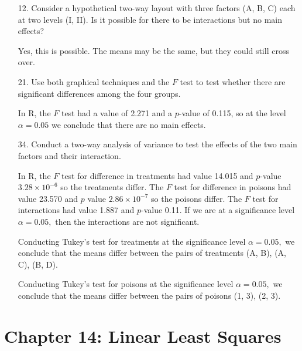 \documentclass{article}
\begin{document}
\begin{itemize}
	\item[12.] Consider a hypothetical two-way layout with three factors (A, B, C) each at two levels (I, II). Is it possible for there to be interactions but no main effects?
		\begin{answer*}
			Yes, this is possible. The means may be the same, but they could still cross over.
		\end{answer*}

	\item[21.] Use both graphical techniques and the $F$ test to test whether there are significant differences among the four groups. 
		\begin{soln}
			In R, the $F$ test had a value of 2.271 and a $p$-value of 0.115, so at the level $\alpha=0.05$ we conclude that there are no main effects.
		\end{soln}

	\item[34.] Conduct a two-way analysis of variance to test the effects of the two main factors and their interaction.
		\begin{soln}
			In R, the $F$ test for difference in treatments had value 14.015 and $p$-value $3.28\times 10^{-6}$ so the treatments differ. The $F$ test for difference in poisons had value 23.570 and $p$ value $2.86\times 10^{-7}$ so the poisons differ. The $F$ test for interactions had value 1.887 and $p$-value 0.11. If we are at a significance level $\alpha=0.05,$ then the interactions are not significant.

			Conducting Tukey's test for treatments at the significance level $\alpha=0.05,$ we conclude that the means differ between the pairs of treatments (A, B), (A, C), (B, D).

			Conducting Tukey's test for poisons at the significance level $\alpha=0.05,$ we conclude that the means differ between the pairs of poisons (1, 3), (2, 3).
		\end{soln}

\end{itemize}

\section*{Chapter 14: Linear Least Squares}
\end{document}
